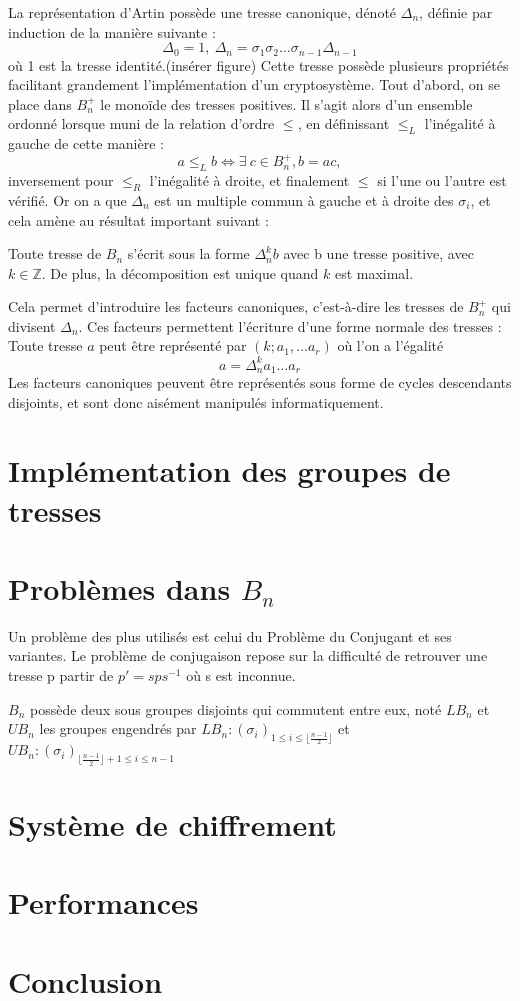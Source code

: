 \documentclass[a4paper,100pt]{article}
\begin{document}
La représentation d'Artin possède une tresse canonique, dénoté $\Delta_n$, définie par induction de la manière suivante :
\[\Delta_0 = 1,\ \Delta_n = \sigma_1\sigma_2\dots\sigma_{n-1}\Delta_{n-1}\] où 1 est la tresse identité.(insérer figure)
Cette tresse possède plusieurs propriétés facilitant grandement l'implémentation d'un cryptosystème. Tout d'abord, on se place dans $B_n^+$ le monoïde des tresses positives. Il s'agit alors d'un ensemble ordonné lorsque muni de la relation d'ordre $\leq$, en définissant $\leq_L$ l'inégalité à gauche de cette manière : \[a \leq_L b \iff \exists \ c \in B_n^+, b = ac,\] inversement pour $\leq_R$ l'inégalité à droite, et finalement $\leq$ si l'une ou l'autre est vérifié.
Or on a que $\Delta_n$ est un multiple commun à gauche et à droite des $\sigma_i$, et cela amène au résultat important suivant :

Toute tresse de $B_n$ s'écrit sous la forme $\Delta_n^{k}b$ avec b une tresse positive, avec $k\in\mathbb{Z}$. De plus, la décomposition est unique quand $k$ est maximal.

Cela permet d'introduire les facteurs canoniques, c'est-à-dire les tresses de $B_n^+$ qui divisent $\Delta_n$. Ces facteurs permettent l'écriture d'une forme normale des tresses : Toute tresse $a$ peut être représenté par $(k;a_1,\dots a_r)$ où l'on a l'égalité \[a = \Delta_n^ka_1\dots a_r\]
Les facteurs canoniques peuvent être représentés sous forme de cycles descendants disjoints, et sont donc aisément manipulés informatiquement.

\section{Implémentation des groupes de tresses}
\section{Problèmes dans $B_n$}
Un problème des plus utilisés est celui du Problème du Conjugant et ses variantes. Le problème de conjugaison repose sur la difficulté de retrouver une tresse p  partir de $p' = sps^{-1}$ où s est inconnue.

$B_n$ possède deux sous groupes disjoints qui commutent entre eux, noté $LB_n$ et $UB_n$ les groupes engendrés par \newline \centering$LB_n : (\sigma_i)_{1\le i\le \lfloor {\frac {n-1}{2}}\rfloor}$ et
$UB_n : (\sigma_i)_{\lfloor \frac {n-1}{2}\rfloor + 1 \leq i\leq n-1}$











\raggedright
\section{Système de chiffrement}
\section{Performances}
\section{Conclusion}
\end{document}
